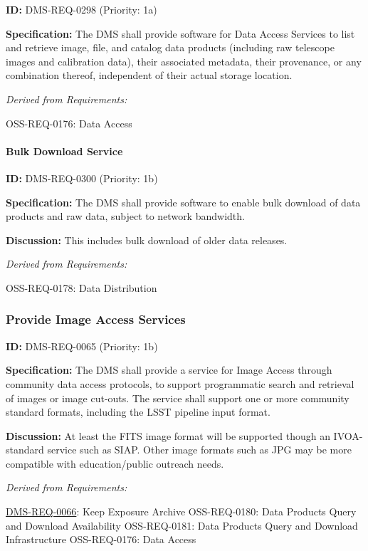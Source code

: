 \documentclass[SE,toc,lsstdraft]{lsstdoc}
\begin{document}
\label{DMS-REQ-0298}
\textbf{ID:} DMS-REQ-0298 (Priority: 1a)

\textbf{Specification:} The DMS shall provide software for Data Access Services to list and retrieve image, file, and catalog data products (including raw telescope images and calibration data), their associated metadata, their provenance, or any combination thereof, independent of their actual storage location.

\emph{Derived from Requirements:}

OSS-REQ-0176:
Data Access \newline

\paragraph{Bulk Download Service}\hfill  %

\label{DMS-REQ-0300}
\textbf{ID:} DMS-REQ-0300 (Priority: 1b)

\textbf{Specification:} The DMS shall provide software to enable bulk download of data products and raw data, subject to network bandwidth.

\textbf{Discussion:} This includes bulk download of older data releases.

\emph{Derived from Requirements:}

OSS-REQ-0178:
Data Distribution \newline

\subsubsection{Provide Image Access Services}

\label{DMS-REQ-0065}
\textbf{ID:} DMS-REQ-0065 (Priority: 1b)

\textbf{Specification:} The DMS shall provide a service for Image Access through community data access protocols, to support programmatic search and retrieval of images or image cut-outs. The service shall support one or more community standard formats, including the LSST pipeline input format.

\textbf{Discussion:} At least the FITS image format will be supported though an IVOA-standard service such as SIAP. Other image formats such as JPG may be more compatible with education/public outreach needs.

\emph{Derived from Requirements:}

\hyperref[DMS-REQ-0066]{DMS-REQ-0066}:
Keep Exposure Archive \newline
OSS-REQ-0180:
Data Products Query and Download Availability \newline
OSS-REQ-0181:
Data Products Query and Download Infrastructure \newline
OSS-REQ-0176:
Data Access \newline
\end{document}
